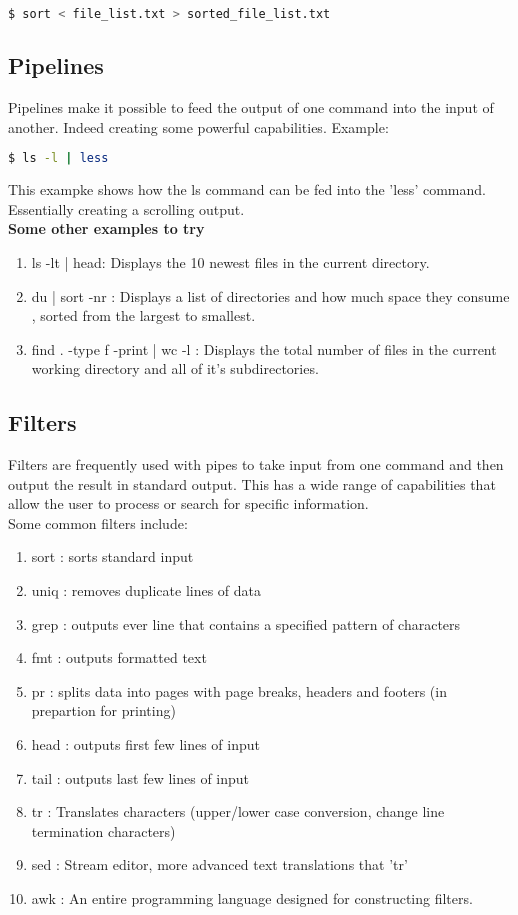 \documentclass[12pt, letterpaper]{report}
\begin{document}
\begin{lstlisting}[language=Bash,framexleftmargin=5mm,frame=single,xleftmargin=18pt]
$ sort < file_list.txt > sorted_file_list.txt
\end{lstlisting}

\subsection{Pipelines}
Pipelines make it possible to feed the output of one command into the input of
another. Indeed creating some powerful capabilities. Example:

\begin{lstlisting}[language=Bash,framexleftmargin=5mm,frame=single,xleftmargin=18pt]
$ ls -l | less
\end{lstlisting}
This exampke shows how the ls command can be fed into the 'less' command. Essentially
creating a scrolling output.\\
\textbf{Some other examples to try}
\begin{enumerate}
	\item ls -lt | head: Displays the 10 newest files in the current directory.
	\item du | sort -nr : Displays a list of directories and how much space they consume
		, sorted from the largest to smallest.
	\item find . -type f -print | wc -l : Displays the total number of files in the current
		working directory and all of it's subdirectories.
\end{enumerate}

\subsection{Filters}
Filters are frequently used with pipes to take input from one command and then 
output the result in standard output. This has a wide range of capabilities that
allow the user to process or search for specific information.\\
Some common filters include:
\begin{enumerate}
	\item sort : sorts standard input
	\item uniq : removes duplicate lines of data
	\item grep : outputs ever line that contains a specified pattern of characters
	\item fmt : outputs formatted text
	\item pr : splits data into pages with page breaks, headers and footers (in prepartion for printing)
	\item head : outputs first few lines of input
	\item tail : outputs last few lines of input
	\item tr : Translates characters (upper/lower case conversion, change line termination characters)
	\item sed : Stream editor, more advanced text translations that 'tr'
	\item awk : An entire programming language designed for constructing filters.
\end{enumerate}
\end{document}
